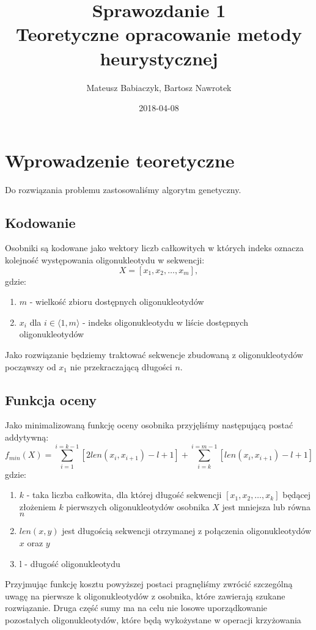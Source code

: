 \documentclass{article}
\title{Sprawozdanie 1 \\ Teoretyczne opracowanie metody heurystycznej}
\date{2018-04-08}
\author{Mateusz Babiaczyk, Bartosz Nawrotek}
\begin{document}
\maketitle
\section{Wprowadzenie teoretyczne}
Do rozwiązania problemu zastosowaliśmy algorytm genetyczny.
\subsection{Kodowanie}
Osobniki są kodowane jako wektory liczb całkowitych w których indeks oznacza kolejność występowania oligonukleotydu w sekwencji:
\begin{equation}
	X = [ x_{1}, x_{2}, \ldots , x_{m}] , 
\end{equation}
gdzie:
\begin{enumerate}
	\item $m$ - wielkość zbioru dostępnych oligonukleotydów
	\item $x_{i}$ dla $i \in \langle1, m\rangle$ - indeks oligonukleotydu w liście dostępnych oligonukleotydów
\end{enumerate}
Jako rozwiązanie będziemy traktować sekwencje zbudowaną z oligonukleotydów począwszy od $x_{1}$ nie przekraczającą długości $n$.
\subsection{Funkcja oceny}
Jako minimalizowaną funkcję oceny osobnika przyjęliśmy następującą postać addytywną:
\begin{equation}
	f_{min}(X) = \sum_{i = 1}^{i = k - 1}{[2len(x_{i}, x_{i+1}) - l + 1]} + \sum_{i = k}^{i = m - 1}{[len(x_{i}, x_{i+1})- l + 1]}
\end{equation}
gdzie:
\begin{enumerate}
	\item $k$ - taka liczba całkowita, dla której długość sekwencji $[x_{1}, x_{2}, \ldots , x_{k}]$ będącej złożeniem $k$ pierwszych oligonukleotydów osobnika $X$ jest mniejsza lub równa $n$
	\item $len(x, y)$ jest długością sekwencji otrzymanej z połączenia oligonukleotydów $x$ oraz $y$
	\item l - długość oligonukleotydu
\end{enumerate}
Przyjmując funkcję kosztu powyższej postaci pragnęliśmy zwrócić szczególną uwagę na pierwsze k oligonukleotydów z osobnika, które zawierają szukane rozwiązanie. Druga część sumy ma na celu nie losowe uporządkowanie pozostałych oligonukleotydów, które będą wykożystane w operacji krzyżowania
\end{document}
